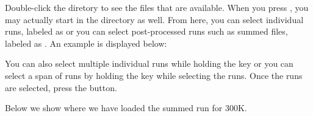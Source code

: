 Double-click the  diretory to see the files that are available. When you press , you may actually start in the  directory as well. From here, you can select individual runs, labeled as  or you can select post-processed runs such as summed files, labeled as .  An example is displayed below:

\noindent{}

You can also select multiple individual runs while holding the  key or you can select a span of runs by holding the  key while selecting the runs. Once the runs are selected, press the  button. 

Below we show where we have loaded the summed run for 300K. 

\noindent{} \label{fig_multiBraggBanks}

